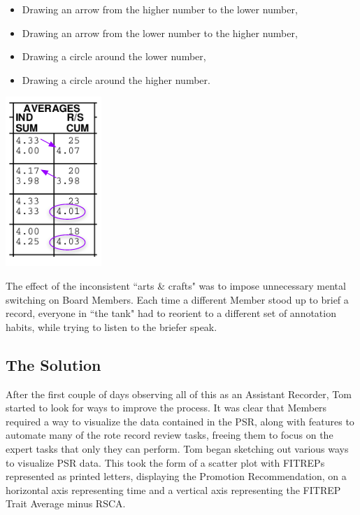 \documentclass[UTF8]{article}
\begin{document}
\begin{minipage}{0.7\linewidth}
\begin{itemize}
  \item Drawing an arrow from the higher number to the lower number,
  \item Drawing an arrow from the lower number to the higher number,
  \item Drawing a circle around the lower number,
  \item Drawing a circle around the higher number.
\end{itemize}
\end{minipage}
\hfill
\begin{minipage}{0.3\linewidth}
  \includegraphics[width=0.4\linewidth]{inconsisent_annotations.png}\\
\end{minipage}



The effect of the inconsistent ``arts \& crafts" was to impose unnecessary mental 
switching on Board Members. Each time a different Member stood up to brief a record,
everyone in ``the tank" had to reorient to a different set of annotation habits,
while trying to listen to the briefer speak. \\

\subsection{The Solution}

After the first couple of days observing all of this as an Assistant Recorder, 
Tom started to look for ways to improve the process. It was clear that Members 
required a way to visualize the data contained in the PSR, along with features 
to automate many of the rote record review tasks, freeing them to focus on the 
expert tasks that only they can perform. Tom began sketching out various ways to
visualize PSR data. This took the form of a scatter plot with FITREPs 
represented as printed letters, displaying the Promotion Recommendation, on a 
horizontal axis representing time and a vertical axis representing the FITREP
Trait Average minus RSCA. \\
\end{document}
